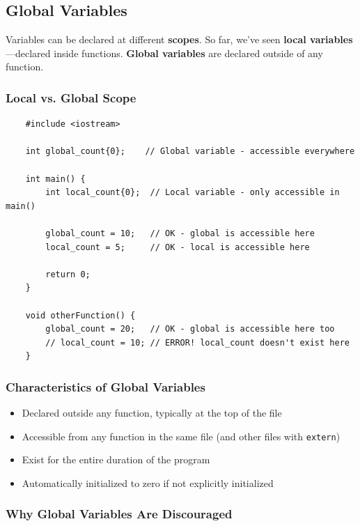 \subsection{Global Variables}

Variables can be declared at different \textbf{scopes}. So far, we've seen \textbf{local variables}—declared inside functions. \textbf{Global variables} are declared outside of any function.

\subsubsection{Local vs. Global Scope}

\begin{lstlisting}
	#include <iostream>
	
	int global_count{0};    // Global variable - accessible everywhere
	
	int main() {
		int local_count{0};  // Local variable - only accessible in main()
		
		global_count = 10;   // OK - global is accessible here
		local_count = 5;     // OK - local is accessible here
		
		return 0;
	}
	
	void otherFunction() {
		global_count = 20;   // OK - global is accessible here too
		// local_count = 10; // ERROR! local_count doesn't exist here
	}
\end{lstlisting}

\subsubsection{Characteristics of Global Variables}

\begin{itemize}
	\item Declared outside any function, typically at the top of the file
	\item Accessible from any function in the same file (and other files with \texttt{extern})
	\item Exist for the entire duration of the program
	\item Automatically initialized to zero if not explicitly initialized
\end{itemize}

\subsubsection{Why Global Variables Are Discouraged}

